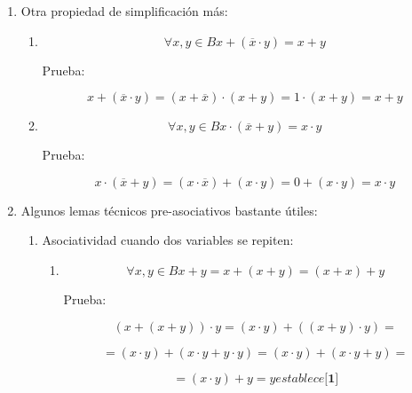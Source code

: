 \documentclass[
]{article}
\begin{document}
\begin{enumerate}
\begin{enumerate}
\begin{enumerate}
\begin{enumerate}
\begin{enumerate}
          \[= {\left( {\left( {{x + y} + \overline{z}} \right) \cdot \left( {{x + \overline{y}} + \overline{z}} \right)} \right) \cdot \left( {\left( {{x + y} + z} \right) \cdot \left( {{\overline{x} + y} + z} \right)} \right)}\]

          \[= {\left( {x + \overline{z}} \right) \cdot \left( {y + z} \right)}\]
        \end{enumerate}
      \end{enumerate}
    \item
      Otra propiedad de simplificación más:

      \begin{enumerate}
      \def\labelenumiv{\arabic{enumiv}.}
      \item
        \[\forall x,{y \in B}{{x + {({\overline{x} \cdot y})}} = {x + y}}\]

        Prueba:

        \[{{{x + {({\overline{x} \cdot y})}} = {{({x + \overline{x}})} \cdot {({x + y})}}} = {1 \cdot {({x + y})}}} = {x + y}\]
      \item
        \[\forall x,{y \in B}{{x \cdot {({\overline{x} + y})}} = {x \cdot y}}\]

        Prueba:

        \[{{{x \cdot {({\overline{x} + y})}} = {{({x \cdot \overline{x}})} + {({x \cdot y})}}} = {0 + {({x \cdot y})}}} = {x \cdot y}\]
      \end{enumerate}
    \item
      Algunos lemas técnicos pre-asociativos bastante útiles:

      \begin{enumerate}
      \def\labelenumiv{\arabic{enumiv}.}
      \item
        Asociatividad cuando dos variables se repiten:

        \begin{enumerate}
        \def\labelenumv{\arabic{enumv}.}
        \item
          \[\forall x,{y \in B}{{{x + y} = {x + {({x + y})}}} = {{({x + x})} + y}}\]

          Prueba:

          \[{}{}{{{{({x + {({x + y})}})} \cdot y} = {{({x \cdot y})} + {({{({x + y})} \cdot y})}}} =}\]

          \[{}{{{= {{({x \cdot y})} + {({{x \cdot y} + {y \cdot y}})}}} = {{({x \cdot y})} + {({{x \cdot y} + y})}}} =}\]

          \[{}{{= {{({x \cdot y})} + y}} = y}{}{}{}\mathit{establece}{\lbrack\mathbf{1}\rbrack}\]


\end{enumerate}
\end{enumerate}
\end{enumerate}
\end{enumerate}
\end{enumerate}
\end{document}
